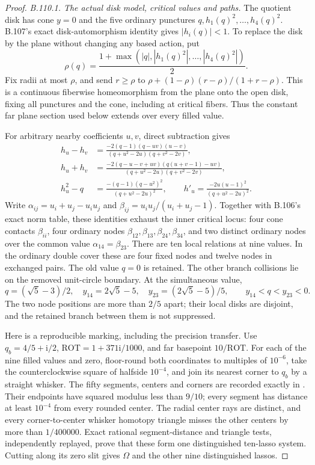 \begin{proof}
\emph{B.110.1. The actual disk model, critical values and paths.}
The quotient disk has cone $y=0$ and the five ordinary punctures
$q,h_1(q)^2,\ldots,h_4(q)^2$. B.107's exact disk-automorphism
identity gives $|h_i(q)|<1$. To replace the disk by the plane without
changing any based action, put
\[
 \rho(q)=\frac{1+\max(|q|,|h_1(q)^2|,\ldots,|h_4(q)^2|)}2.
\]
Fix radii at most $\rho$, and send $r\geq\rho$ to
$\rho+(1-\rho)(r-\rho)/(1+r-\rho)$. This is a continuous
fiberwise homeomorphism from the plane onto the open disk, fixing
all punctures and the cone, including at critical fibers. Thus the
constant far plane section used below extends over every filled value.

For arbitrary nearby coefficients $u,v$, direct subtraction gives
\begin{align*}
 h_u-h_v&=\frac{-2(q-1)(q-uv)(u-v)}
 {(q+u^2-2u)(q+v^2-2v)},\\
 h_u+h_v&=\frac{-2(q-u-v+uv)(q(u+v-1)-uv)}
 {(q+u^2-2u)(q+v^2-2v)},\\
 h_u^2-q&=\frac{-(q-1)(q-u^2)^2}{(q+u^2-2u)^2},
 \qquad h'_u=\frac{-2u(u-1)^2}{(q+u^2-2u)^2}.
\end{align*}
Write $\alpha_{ij}=u_i+u_j-u_iu_j$ and
$\beta_{ij}=u_iu_j/(u_i+u_j-1)$. Together with B.106's exact
norm table, these identities exhaust the inner critical locus:
four cone contacts $\beta_{ii}$, four ordinary nodes
$\beta_{12},\beta_{13},\beta_{24},\beta_{34}$, and two distinct
ordinary nodes over the common value $\alpha_{14}=\beta_{23}$.
There are ten local relations at nine values. In the ordinary double
cover these are four fixed nodes and twelve nodes in exchanged pairs.
The old value $q=0$ is retained. The other branch collisions lie on
the removed unit-circle boundary. At the simultaneous value,
\[
 q=(\sqrt5-3)/2,\quad y_{14}=2\sqrt5-5,\quad
 y_{23}=(2\sqrt5-5)/5,
 \qquad y_{14}<q<y_{23}<0.
\]
The two node positions are more than $2/5$ apart; their local disks
are disjoint, and the retained branch between them is not suppressed.

Here is a reproducible marking, including the precision transfer.
Use $q_b=4/5+\mathrm i/2$, $\mathrm{ROT}=1+371\mathrm i/1000$,
and far basepoint $10/\mathrm{ROT}$. For each of the nine filled
values and zero, floor-round both coordinates to multiples of
$10^{-6}$, take the counterclockwise square of halfside $10^{-4}$,
and join its nearest corner to $q_b$ by a straight whisker.
The fifty segments, centers and corners are recorded exactly in
.
Their endpoints have squared modulus less than $9/10$; every
segment has distance at least $10^{-4}$ from every rounded center.
The radial center rays are distinct, and every corner-to-center
whisker homotopy triangle misses the other centers by more than
$1/400000$. Exact rational segment-distance and triangle tests,
independently replayed, prove that these form one distinguished
ten-lasso system. Cutting along its zero slit gives $\Omega$ and
the other nine distinguished lassos.


\end{proof}
